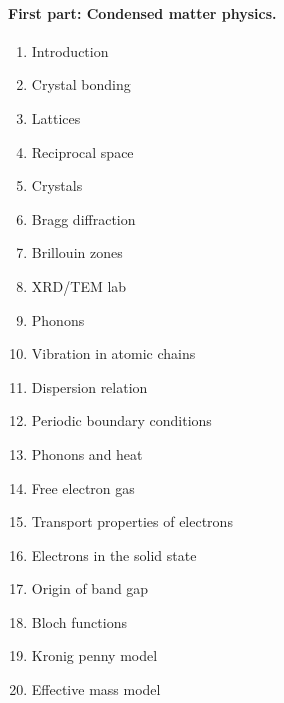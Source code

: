 \documentclass[%
oneside,                 %
final,                   %
10pt]{article}
\begin{document}
\paragraph{First part: Condensed matter physics.}
\begin{enumerate}
\item Introduction 

\item Crystal bonding

\item Lattices  

\item Reciprocal space

\item Crystals 

\item Bragg diffraction 

\item Brillouin zones 

\item XRD/TEM lab 

\item Phonons 

\item Vibration in atomic chains 

\item Dispersion relation 

\item Periodic boundary conditions

\item Phonons and heat 

\item Free electron gas 

\item Transport properties of electrons 

\item Electrons in the solid state  

\item Origin of band gap 

\item Bloch functions 

\item Kronig penny model

\item Effective mass model  
\end{enumerate}

\noindent

 
\end{document}

